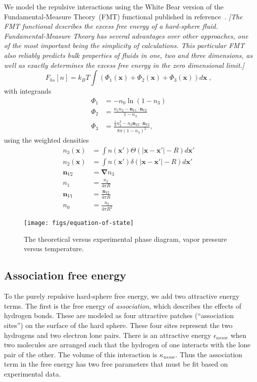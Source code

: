 \documentclass[letterpaper,twocolumn,amsmath,amssymb,prb]{revtex4-1}
\newcommand{\xx}{\textbf{x}}
\newcommand{\needsworklater}[1]{\emph{[#1]}}
\begin{document}
We model the repulsive interactions using the White Bear version of
the Fundamental-Measure Theory~(FMT) functional published in
reference~\cite{roth2002whitebear}.  \needsworklater{The FMT
  functional describes the excess free energy of a hard-sphere
  fluid. Fundamental-Measure Theory has several advantages over other
  approaches, one of the most important being the simplicity of
  calculations.  This particular FMT also reliably predicts bulk
  properties of fluids in one, two and three dimensions, as well as
  exactly determines the excess free energy in the zero dimensional
  limit.}
\begin{equation}
F_{hs}[n] = k_B T \int (\Phi_1(\xx) + \Phi_2(\xx) + \Phi_3(\xx)) d\xx \; ,
\end{equation}
with integrands
\begin{align}
\Phi_1 &= -n_0 \ln\left( 1 - n_3\right)\\
\Phi_2 &= \frac{n_1 n_2 - \mathbf{n}_{V1} \cdot\mathbf{n}_{V2}}{1-n_3} \\
\Phi_3 &= \frac{
  \frac13 n_2^3 - n_2 \mathbf{n}_{V2} \cdot \mathbf{n}_{V2}
}{
  8\pi \left( 1 - n_3 \right)^2
} ,
\end{align}
using the weighted densities
\begin{align}
  n_3(\xx) &= \int n(\xx') \Theta(\left|\xx - \xx'\right| - R) d\xx' \\
  n_2(\xx) &= \int n(\xx') \delta(\left|\xx - \xx'\right| - R) d\xx'
  \\
  \mathbf{n}_{V2} &= \mathbf{\nabla} n_3 \\
  n_1 &= \frac{n_2}{4\pi R}\\
  \mathbf{n}_{V1} &= \frac{\mathbf{n}_{V2}}{4\pi R}\\
  n_0 &= \frac{n_2}{4\pi R^2}
\end{align}


\begin{figure}
\begin{center}
\texttt{[image: figs/equation-of-state]}
\end{center}
\caption{The theoretical versus experimental phase diagram, vapor
  pressure versus temperature.  }
\label{fig:equation-of-state}
\end{figure}

\subsection{Association free energy}
To the purely repulsive hard-sphere free energy, we add two attractive
energy terms.  The first is the free energy of \emph{association},
which describes the effects of hydrogen bonds.  These are modeled as
four attractive patches (``association sites'') on the surface of the
hard sphere.  These four sites represent the two hydrogens and two
electron lone pairs.  There is an attractive energy
$\epsilon_\textit{assoc}$ when two molecules are arranged such that
the hydrogen of one interacts with the lone pair of the other.  The
volume of this interaction is $\kappa_\textit{assoc}$.  Thus the
association term in the free energy has two free parameters that must
be fit based on experimental data.
\end{document}
